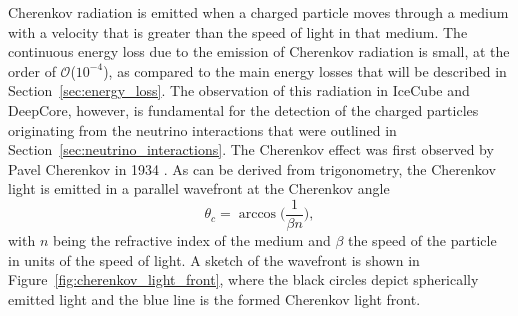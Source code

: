 Cherenkov radiation is emitted when a charged particle moves through a medium with a velocity that is greater than the speed of light in that medium.
The continuous energy loss due to the emission of Cherenkov radiation is small, at the order of $\mathcal{O}$($10^{-4}$), as compared to the main energy losses that will be described in Section~\ref{sec:energy_loss}.
The observation of this radiation in IceCube and DeepCore, however, is fundamental for the detection of the charged particles originating from the neutrino interactions that were outlined in Section~\ref{sec:neutrino_interactions}.
The Cherenkov effect was first observed by Pavel Cherenkov in 1934 \cite{CherenkovPhysRev.52.378}.
As can be derived from trigonometry, the Cherenkov light is emitted in a parallel wavefront at the Cherenkov angle
\begin{equation}
    \theta_c = \arccos\Big(\frac{1}{\beta n}\Big),
    \label{eq:cherenkov_angle}
\end{equation}
with $n$ being the refractive index of the medium and $\beta$ the speed of the particle in units of the speed of light.
A sketch of the wavefront is shown in Figure~\ref{fig:cherenkov_light_front}, where the black circles depict spherically emitted light and the blue line is the formed Cherenkov light front.
